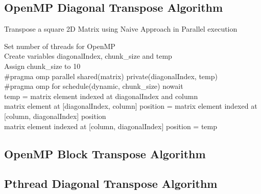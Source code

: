 \documentclass[10pt, onecolumn]{article}
\begin{document}
\subsection{OpenMP Diagonal Transpose Algorithm}

%
\begin{algorithm}[H]
    \label{Alg:OpenMPDiagonalAlgorithm}
    \caption{Transpose a square 2D Matrix using Naive Approach in Parallel execution}
    Set number of threads for OpenMP\\
    Create variables diagonalIndex, chunk\_size and temp\\
    Assign chunk\_size to 10 \\
    \#pragma omp parallel shared(matrix) private(diagonalIndex, temp)\\
    \#pragma omp for schedule(dynamic, chunk\_size) nowait\\
    {
        {
            temp = matrix element indexed at diagonalIndex and column \\
            matrix element at [diagonalIndex, column] position = matrix element indexed at [column,  diagonalIndex] position \\
            matrix element indexed at [column, diagonalIndex] position = temp
        }
    }
\end{algorithm}
%
\subsection{OpenMP Block Transpose Algorithm}
%

%
\subsection{Pthread Diagonal Transpose Algorithm}
%
\end{document}

